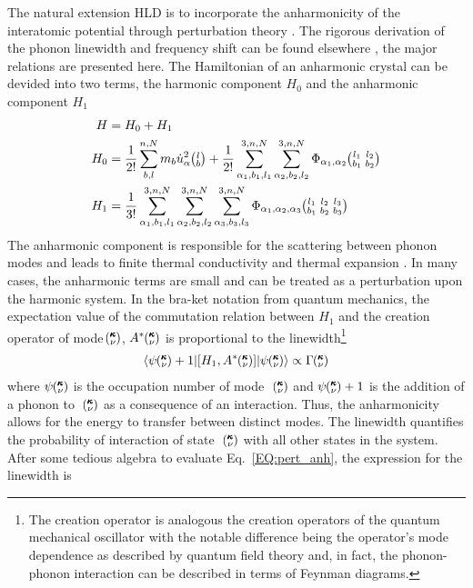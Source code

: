The natural extension HLD is to incorporate the anharmonicity of the interatomic potential through perturbation theory \cite{turneythesis}. The rigorous derivation of the phonon linewidth and frequency shift can be found elsewhere \cite{PhysRev.128.2589}, the major relations are presented here. The Hamiltonian of an anharmonic crystal can be devided into two terms, the harmonic component $H_0$ and the anharmonic component $H_1$
%
\begin{equation}\label{EQ:H_anh}
\begin{split}
H&=H_0+H_1\\
H_0&=\frac{1}{2!}\sum_{b,l}^{n,N}m_b\dot{u}_\alpha^2 \lb + \frac{1}{2!}\sum_{\alpha_1,b_1,l_1}^{3,n,N}\sum_{\alpha_2,b_2,l_2}^{3,n,N}\Phi_{\alpha_1,\alpha_2} \lblb\\
H_1&=\frac{1}{3!}\sum_{\alpha_1,b_1,l_1}^{3,n,N}\sum_{\alpha_2,b_2,l_2}^{3,n,N}\sum_{\alpha_3,b_3,l_3}^{3,n,N}\Phi_{\alpha_1,\alpha_2,\alpha_3} \lblblb\\
\end{split}
\end{equation}
%
The anharmonic component is responsible for the scattering between phonon modes and leads to finite thermal conductivity and thermal expansion \cite{srivastava1990physics}. In many cases, the anharmonic terms are small and can be treated as a perturbation upon the harmonic system. In the bra-ket notation from quantum mechanics, the expectation value of the commutation relation between $H_1$ and the creation operator of mode $\mspace{-4.0mu}\left(\mspace{-8.0mu} \begin{smallmatrix}&\pmb{\kappa} \\&\nu\end{smallmatrix} \mspace{-3.0mu}\right)$, $A^*\mspace{-4.0mu}\left(\mspace{-8.0mu} \begin{smallmatrix}&\pmb{\kappa} \\&\nu\end{smallmatrix} \mspace{-3.0mu}\right)$ is proportional to the linewidth\footnote{The creation operator is analogous the creation operators of the quantum mechanical oscillator with the notable difference being the operator's mode dependence as described by quantum field theory and, in fact, the phonon-phonon interaction can be described in terms of Feynman diagrams.}
%
\begin{equation}\label{EQ:pert_anh}
\begin{split}
\langle \psi \kv+1 | [H_1,A^*\kv] | \psi \kv\rangle \propto \Gamma \kv
\end{split}
\end{equation}
%
where $\psi \mspace{-4.0mu}\left(\mspace{-8.0mu} \begin{smallmatrix}&\pmb{\kappa} \\&\nu\end{smallmatrix} \mspace{-3.0mu}\right)$ is the occupation number of mode ~$\mspace{-4.0mu}\left(\mspace{-8.0mu} \begin{smallmatrix}&\pmb{\kappa} \\&\nu\end{smallmatrix} \mspace{-3.0mu}\right)$ and $\psi \mspace{-4.0mu}\left(\mspace{-8.0mu} \begin{smallmatrix}&\pmb{\kappa} \\&\nu\end{smallmatrix} \mspace{-3.0mu}\right)+1$ is the addition of a phonon to ~$\mspace{-4.0mu}\left(\mspace{-8.0mu} \begin{smallmatrix}&\pmb{\kappa} \\&\nu\end{smallmatrix} \mspace{-3.0mu}\right)$ as a consequence of an interaction. Thus, the anharmonicity allows for the energy to transfer between distinct modes. The linewidth quantifies the probability of interaction of state ~$\mspace{-4.0mu}\left(\mspace{-8.0mu} \begin{smallmatrix}&\pmb{\kappa} \\&\nu\end{smallmatrix} \mspace{-3.0mu}\right)$ with all other states in the system. After some tedious algebra to evaluate Eq.~\ref{EQ:pert_anh}, the expression for the linewidth is
